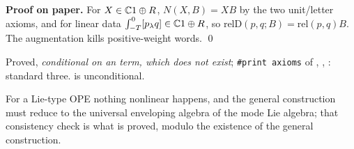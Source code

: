 \textbf{Proof on paper.} For $X\in{\mathbb{C}}1\oplus R$, $N(X,B) = XB$ by the two unit/letter axioms, and for linear data
$\int_{-T}^0[p_\lambda q]\in{\mathbb{C}}1\oplus R$, so $\mathrm{relD}(p,q;B) = \mathrm{rel}(p,q)B$. The augmentation kills positive-weight words. \qed

\begin{status}
Proved, \emph{conditional on an  term, which does not exist}; \texttt{\#print axioms} of
, , : standard three.  is
unconditional.
\end{status}

\begin{physics}
For a Lie-type OPE nothing nonlinear happens, and the general construction must reduce to the universal enveloping algebra of the
mode Lie algebra; that consistency check is what is proved, modulo the existence of the general construction.
\end{physics}


